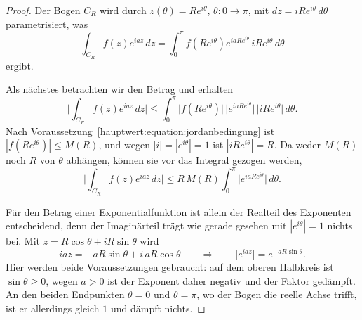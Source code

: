 \begin{proof}
  Der Bogen $C_R$ wird durch
  $z(\theta) = R e^{i \theta}$, $\theta\colon 0 \to \pi$, mit
  $dz = i R e^{i \theta}\,d\theta$ parametrisiert, was
  \begin{equation}
    \int_{C_R} f(z) e^{iaz}\,dz
    =
    \int_{0}^{\pi} f(R e^{i \theta}) e^{i a R e^{i \theta}}
      \, i R e^{i \theta}\,d\theta
  \end{equation}
  ergibt.

  Als nächstes betrachten wir den Betrag und erhalten
  \begin{equation}
    \biggl| \int_{C_R} f(z) e^{iaz}\,dz \biggr|
    \le
    \int_{0}^{\pi}
      \bigl| f(Re^{i\theta}) \bigr|\,
      \bigl| e^{iaRe^{i\theta}} \bigr|\,
      \bigl| i R e^{i \theta} \bigr|
      \,d\theta.
  \end{equation}
  Nach Voraussetzung~\eqref{hauptwert:equation:jordanbedingung} ist
  $|f(Re^{i\theta})| \le M(R)$, und wegen $|i| = |e^{i\theta}| = 1$ ist
  $|iRe^{i\theta}| = R$.
  Da weder $M(R)$ noch $R$ von $\theta$ abhängen, können sie vor das
  Integral gezogen werden,
  \begin{equation}
    \biggl| \int_{C_R} f(z) e^{iaz}\,dz \biggr|
    \le
    R\,M(R) \int_{0}^{\pi} \bigl| e^{iaRe^{i\theta}} \bigr| \,d\theta.
    \label{hauptwert:equation:jordanabschaetzung}
  \end{equation}

  Für den Betrag einer Exponentialfunktion ist allein der Realteil des
  Exponenten entscheidend, denn der Imaginärteil trägt wie gerade gesehen mit
  $|e^{i\theta}| = 1$ nichts bei.
  Mit $z = R\cos\theta + iR\sin\theta$ wird
  \begin{equation}
    iaz
    =
    -aR\sin\theta + i\,aR\cos\theta
    \qquad\Rightarrow\qquad
    \bigl| e^{iaz} \bigr| = e^{-aR\sin\theta}.
    \label{hauptwert:equation:jordandaempfung}
  \end{equation}
  Hier werden beide Voraussetzungen gebraucht: auf dem oberen Halbkreis ist
  $\sin\theta \ge 0$, wegen $a > 0$ ist der Exponent daher negativ und der
  Faktor gedämpft.
  An den beiden Endpunkten $\theta = 0$ und $\theta = \pi$, wo der Bogen
  die reelle Achse trifft, ist er allerdings gleich $1$ und dämpft nichts.


\end{proof}
